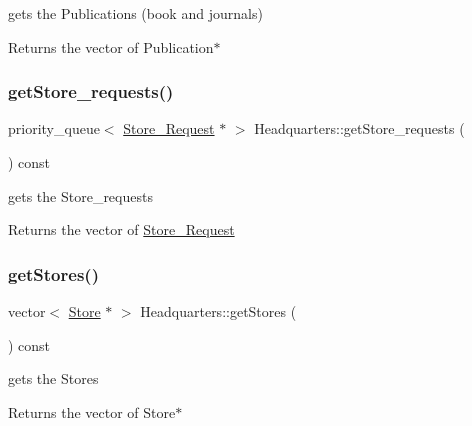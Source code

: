 gets the Publications (book and journals) 

\begin{DoxyReturn}{Returns}
the vector of Publication$\ast$ 
\end{DoxyReturn}
\mbox{\label{class_headquarters_af7a7c90b995178f8417d3523cd67a3a2}} 
\subsubsection{\texorpdfstring{get\+Store\+\_\+requests()}{getStore\_requests()}}
{\footnotesize\ttfamily priority\+\_\+queue$<$ \hyperlink{class_store___request}{Store\+\_\+\+Request} $\ast$ $>$ Headquarters\+::get\+Store\+\_\+requests (\begin{DoxyParamCaption}{ }\end{DoxyParamCaption}) const}



gets the Store\+\_\+requests 

\begin{DoxyReturn}{Returns}
the vector of \hyperlink{class_store___request}{Store\+\_\+\+Request} 
\end{DoxyReturn}
\mbox{\label{class_headquarters_a37aa3d25dcd693e6537a0bdd361942d8}} 
\subsubsection{\texorpdfstring{get\+Stores()}{getStores()}}
{\footnotesize\ttfamily vector$<$ \hyperlink{class_store}{Store} $\ast$ $>$ Headquarters\+::get\+Stores (\begin{DoxyParamCaption}{ }\end{DoxyParamCaption}) const}



gets the Stores 

\begin{DoxyReturn}{Returns}
the vector of Store$\ast$ 
\end{DoxyReturn}
\mbox{\label{class_headquarters_ab572bdf482526f637732ae8736fc1860}} 
